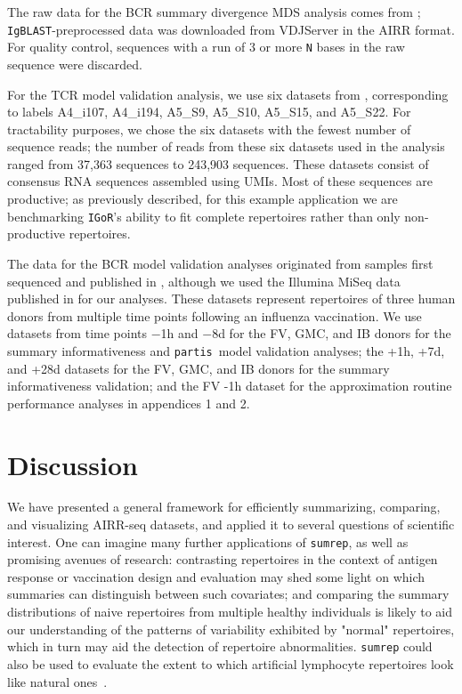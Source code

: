 \documentclass{article}
\newcommand{\partis}{\texttt{partis}}
\newcommand{\igor}{\texttt{IGoR}}
\newcommand{\igblast}{\texttt{IgBLAST}}
\begin{document}
The raw data for the BCR summary divergence MDS analysis comes from \cite{Rubelt2016-tl}; \igblast-preprocessed data was downloaded from VDJServer in the AIRR format.
For quality control, sequences with a run of 3 or more \texttt{N} bases in the raw sequence were discarded.

For the TCR model validation analysis, we use six datasets from \cite{Britanova2016-iw}, corresponding to labels A4\_i107, A4\_i194, A5\_S9, A5\_S10, A5\_S15, and A5\_S22.
For tractability purposes, we chose the six datasets with the fewest number of sequence reads; the number of reads from these six datasets used in the analysis ranged from 37,363 sequences to 243,903 sequences.
These datasets consist of consensus RNA sequences assembled using UMIs.
Most of these sequences are productive; as previously described, for this example application we are benchmarking \igor's ability to fit complete repertoires rather than only non-productive repertoires.

The data for the BCR model validation analyses originated from samples first sequenced and published in \cite{Laserson2014-dx}, although we used the Illumina MiSeq data published in \cite{Gupta2017-ve} for our analyses.
These datasets represent repertoires of three human donors from multiple time points following an influenza vaccination.
We use datasets from time points $-$1h and $-$8d for the FV, GMC, and IB donors for the summary informativeness and \partis\ model validation analyses; the +1h, +7d, and +28d datasets for the FV, GMC, and IB donors for the summary informativeness validation; and the FV -1h dataset for the approximation routine performance analyses in appendices 1 and 2.

\section*{Discussion}
We have presented a general framework for efficiently summarizing, comparing, and visualizing AIRR-seq datasets, and applied it to several questions of scientific interest.
One can imagine many further applications of \texttt{sumrep}, as well as promising avenues of research: contrasting repertoires in the context of antigen response or vaccination design and evaluation may shed some light on which summaries can distinguish between such covariates; and comparing the summary distributions of naive repertoires from multiple healthy individuals is likely to aid our understanding of the patterns of variability exhibited by "normal" repertoires, which in turn may aid the detection of repertoire abnormalities.
\texttt{sumrep} could also be used to evaluate the extent to which artificial lymphocyte repertoires look like natural ones~\cite{Finlay2012}.
\end{document}
